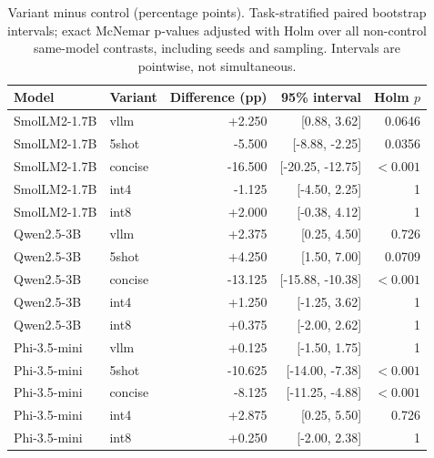 \begin{table}[tbp]
\centering\small
\caption{Variant minus control (percentage points). Task-stratified paired bootstrap intervals; exact McNemar p-values adjusted with Holm over all non-control same-model contrasts, including seeds and sampling. Intervals are pointwise, not simultaneous.}\label{tab:sensitivity}
\begin{tabular}{llrrr}\toprule
Model & Variant & Difference (pp) & 95\% interval & Holm $p$ \\
\midrule
SmolLM2-1.7B & vllm & +2.250 & [0.88, 3.62] & 0.0646 \\
SmolLM2-1.7B & 5shot & -5.500 & [-8.88, -2.25] & 0.0356 \\
SmolLM2-1.7B & concise & -16.500 & [-20.25, -12.75] & $<0.001$ \\
SmolLM2-1.7B & int4 & -1.125 & [-4.50, 2.25] & 1 \\
SmolLM2-1.7B & int8 & +2.000 & [-0.38, 4.12] & 1 \\
Qwen2.5-3B & vllm & +2.375 & [0.25, 4.50] & 0.726 \\
Qwen2.5-3B & 5shot & +4.250 & [1.50, 7.00] & 0.0709 \\
Qwen2.5-3B & concise & -13.125 & [-15.88, -10.38] & $<0.001$ \\
Qwen2.5-3B & int4 & +1.250 & [-1.25, 3.62] & 1 \\
Qwen2.5-3B & int8 & +0.375 & [-2.00, 2.62] & 1 \\
Phi-3.5-mini & vllm & +0.125 & [-1.50, 1.75] & 1 \\
Phi-3.5-mini & 5shot & -10.625 & [-14.00, -7.38] & $<0.001$ \\
Phi-3.5-mini & concise & -8.125 & [-11.25, -4.88] & $<0.001$ \\
Phi-3.5-mini & int4 & +2.875 & [0.25, 5.50] & 0.726 \\
Phi-3.5-mini & int8 & +0.250 & [-2.00, 2.38] & 1 \\
\bottomrule\end{tabular}
\end{table}
